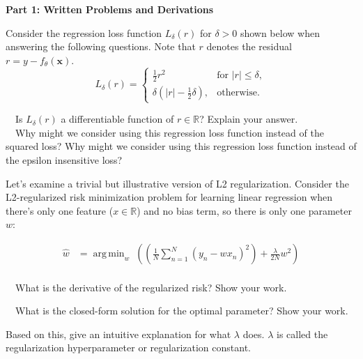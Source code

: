 \documentclass[11pt]{article}
\newcommand{\mbf}[1]{{\mathbf{#1}}}
\DeclareMathOperator*{\argmin}{arg\,min}
\begin{document}
\textbf{Part 1: Written Problems and Derivations}

\begin{problem}{8} Consider the regression loss function $L_{\delta}(r)$ for $\delta>0$ shown below when answering the following questions. Note that $r$ denotes the residual $r=y-f_{\theta}(\mbf{x})$.
    $$L_{\delta}(r) =
        \begin{cases}
            \frac{1}{2}{r^2} & \text{for } |r| \le \delta, \\
            \delta (|r| - \frac{1}{2}\delta), & \text{otherwise.}
         \end{cases}
    $$

     ~~Is $L_{\delta}(r)$ a differentiable function of $r\in\mathbb{R}$? Explain your answer.\\
    
     ~~Why might we consider using this regression loss function instead of the squared loss? Why might we consider using this regression loss function instead of the epsilon insensitive loss?   
    
\end{problem}

\begin{problem}{3} Let's examine a trivial but illustrative version of L2 regularization. Consider the L2-regularized risk minimization problem for learning linear regression when there's only one feature ($x \in \mathbb{R}$) and no bias term, so there is only one parameter $w$:

\begin{align*}    
    \hat{w}&=\argmin_{w}\;\left( \left(\frac{1}{N}\sum_{n=1}^N (y_n-wx_n)^2 \right)+ \frac{\lambda}{2N} w^2 \right)
\end{align*}\\

 ~~What is the derivative of the regularized risk? Show your work.

 ~~What is the closed-form solution for the optimal parameter? Show your work.

 Based on this, give an intuitive explanation for what $\lambda$ does.  $\lambda$ is called the regularization hyperparameter or regularization constant.
    
\end{problem}
\end{document}
